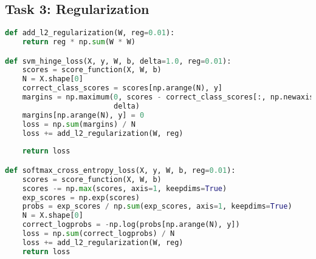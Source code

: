\documentclass{article}
\begin{document}
\subsection{Task 3: Regularization}
\begin{lstlisting}[language=Python]
def add_l2_regularization(W, reg=0.01):
    return reg * np.sum(W * W)

def svm_hinge_loss(X, y, W, b, delta=1.0, reg=0.01):
    scores = score_function(X, W, b)
    N = X.shape[0]
    correct_class_scores = scores[np.arange(N), y]
    margins = np.maximum(0, scores - correct_class_scores[:, np.newaxis] +
                         delta)
    margins[np.arange(N), y] = 0 
    loss = np.sum(margins) / N
    loss += add_l2_regularization(W, reg)
    
    return loss

def softmax_cross_entropy_loss(X, y, W, b, reg=0.01):
    scores = score_function(X, W, b)
    scores -= np.max(scores, axis=1, keepdims=True)
    exp_scores = np.exp(scores)
    probs = exp_scores / np.sum(exp_scores, axis=1, keepdims=True)
    N = X.shape[0]
    correct_logprobs = -np.log(probs[np.arange(N), y])
    loss = np.sum(correct_logprobs) / N
    loss += add_l2_regularization(W, reg)
    return loss
\end{lstlisting}
\end{document}
